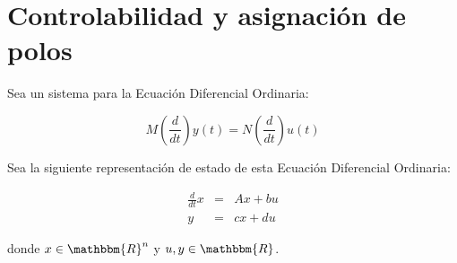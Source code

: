 
\chapter{Controlabilidad y asignación de polos}

    Sea un sistema para la Ecuación Diferencial Ordinaria:

    \begin{equation}
        M \left(\frac{d}{dt} \right) y(t) = N \left(\frac{d}{dt} \right) u(t)
    \end{equation}

    Sea la siguiente representación de estado de esta Ecuación Diferencial Ordinaria:

    \begin{eqnarray}
    \frac{d}{dt} x & = & A x + b u \nonumber \\
    y & = & c x + d u \nonumber
    \end{eqnarray}

    donde $x \in \mathbbm{R}^n$ y $u,y \in \mathbbm{R}$.

